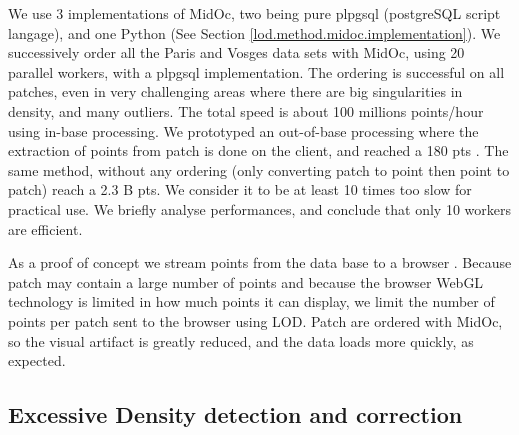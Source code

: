 		
		We use 3 implementations of MidOc, two being pure plpgsql (postgreSQL script langage), and one Python (See Section \ref{lod.method.midoc.implementation}).
		We successively order all the Paris and Vosges data sets with MidOc, using 20 parallel workers, with a plpgsql implementation.
		The ordering is successful on all patches, even in very challenging areas where there are big singularities in density, and many outliers.
		The total speed is about 100 millions points/hour using in-base processing.
		We prototyped an out-of-base processing where the extraction of points from patch is done on the client, and reached a 180 \mega pts \per \hour.
		The same method, without any ordering (only converting patch to point then point to patch) reach a 2.3 B pts\per\hour.
		We consider it to be at least 10 times too slow for practical use.
		We briefly analyse performances, and conclude that only 10 workers are efficient.
		
		 
		As a proof of concept we stream points from the data base to a browser \cite{IGN2014a}. Because patch may contain a large number of points and because the browser WebGL technology is limited in how much points it can display,
		we limit the number of points per patch sent to the browser using LOD. Patch are ordered with MidOc, so the visual artifact is greatly reduced, and the data loads more quickly, as expected. 


	\subsection{Excessive Density detection and correction} 
		
